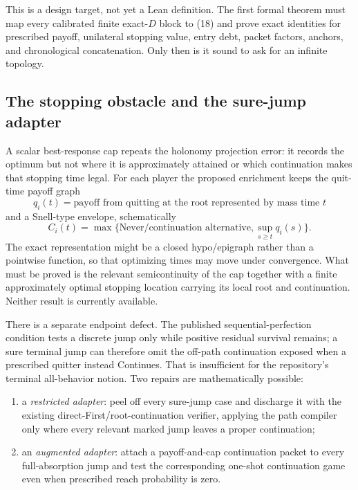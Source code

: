 \documentclass[11pt]{article}
\begin{document}
This is a design target, not yet a Lean definition.  The first formal theorem
must map every calibrated finite exact-$D$ block to (18) and prove exact
identities for prescribed payoff, unilateral stopping value, entry debt,
packet factors, anchors, and chronological concatenation.  Only then is it
sound to ask for an infinite topology.

\subsection{The stopping obstacle and the sure-jump adapter}

A scalar best-response cap repeats the holonomy projection error: it records
the optimum but not where it is approximately attained or which continuation
makes that stopping time legal.  For each player the proposed enrichment keeps
the quit-time payoff graph
\[
 q_i(t)=\text{payoff from quitting at the root represented by mass time }t
\]
and a Snell-type envelope, schematically
\[
 C_i(t)=\max\{\text{Never/continuation alternative},
                    \sup_{s\geq t}q_i(s)\}.
\tag{20}
\]
The exact representation might be a closed hypo/epigraph rather than a
pointwise function, so that optimizing times may move under convergence.
What must be proved is the relevant semicontinuity of the cap together with a
finite approximately optimal stopping location carrying its local root and
continuation.  Neither result is currently available.

There is a separate endpoint defect.  The published sequential-perfection
condition tests a discrete jump only while positive residual survival remains;
a sure terminal jump can therefore omit the off-path continuation exposed when
a prescribed quitter instead Continues.  That is insufficient for the
repository's terminal all-behavior notion.  Two repairs are mathematically
possible:

\begin{enumerate}
\item a \emph{restricted adapter}: peel off every sure-jump case and discharge
it with the existing direct-First/root-continuation verifier, applying the path
compiler only where every relevant marked jump leaves a proper continuation;
\item an \emph{augmented adapter}: attach a payoff-and-cap continuation packet
to every full-absorption jump and test the corresponding one-shot continuation
game even when prescribed reach probability is zero.
\end{enumerate}
\end{document}
